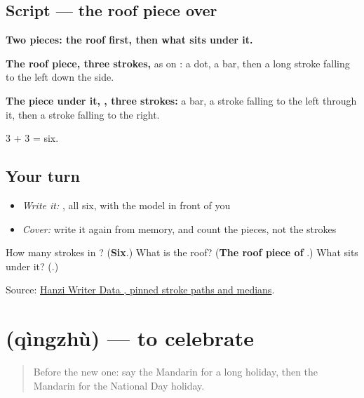 \subsection*{Script — the roof piece over }

\begin{quote}
\end{quote}

\textbf{Two pieces: the roof first, then what sits under it.}

\textbf{The roof piece, three strokes,} as on : a dot, a bar, then a long stroke falling to the left down the side.

\textbf{The piece under it, , three strokes:} a bar, a stroke falling to the left through it, then a stroke falling to the right.

3 + 3 = six.

\subsection*{Your turn}
\begin{itemize}
\raggedright
  \item \emph{Write it:} , all six, with the model in front of you
  \item \emph{Cover:} write it again from memory, and count the pieces, not the strokes
\end{itemize}

\begin{tcolorbox}[breakable,colback=teal!4,colframe=teal!35!black,title={Before you move on}]
How many strokes in ? (\textbf{Six}.) What is the roof? (\textbf{The roof piece of }.) What sits under it? (\textbf{}.)

Source: \href{https://raw.githubusercontent.com/chanind/hanzi-writer-data/68d10a4b21150cae5e1ebbd223eed289cf32d90c/data/\%E5\%BA\%86.json}{Hanzi Writer Data , pinned stroke paths and medians}.
\end{tcolorbox}
\section[\texorpdfstring{\zh{庆祝} (qìngzhù)}{庆祝 (qìngzhù)}]{ (qìngzhù) — to celebrate}

\label{lesson:ZH-C339-qingzhu}



\begin{quote}
Before the new one: say the Mandarin for a long holiday, then the Mandarin for the National Day holiday.
\end{quote}

